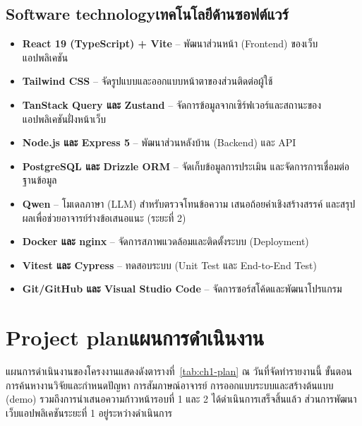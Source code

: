 \subsection{\ifenglish Software technology\else เทคโนโลยีด้านซอฟต์แวร์\fi}

\begin{itemize}
  \item \textbf{React 19 (TypeScript) + Vite} -- พัฒนาส่วนหน้า (Frontend) ของเว็บแอปพลิเคชัน
  \item \textbf{Tailwind CSS} -- จัดรูปแบบและออกแบบหน้าตาของส่วนติดต่อผู้ใช้
  \item \textbf{TanStack Query และ Zustand} -- จัดการข้อมูลจากเซิร์ฟเวอร์และสถานะของแอปพลิเคชันฝั่งหน้าเว็บ
  \item \textbf{Node.js และ Express 5} -- พัฒนาส่วนหลังบ้าน (Backend) และ API
  \item \textbf{PostgreSQL และ Drizzle ORM} -- จัดเก็บข้อมูลการประเมิน และจัดการการเชื่อมต่อฐานข้อมูล
  \item \textbf{Qwen} -- โมเดลภาษา (LLM) สำหรับตรวจโทนข้อความ เสนอถ้อยคำเชิงสร้างสรรค์ และสรุปผลเพื่อช่วยอาจารย์ร่างข้อเสนอแนะ (ระยะที่ 2)
  \item \textbf{Docker และ nginx} -- จัดการสภาพแวดล้อมและติดตั้งระบบ (Deployment)
  \item \textbf{Vitest และ Cypress} -- ทดสอบระบบ (Unit Test และ End-to-End Test)
  \item \textbf{Git/GitHub และ Visual Studio Code} -- จัดการซอร์สโค้ดและพัฒนาโปรแกรม
\end{itemize}

\section{\ifenglish Project plan\else แผนการดำเนินงาน\fi}

แผนการดำเนินงานของโครงงานแสดงดังตารางที่~\ref{tab:ch1-plan} ณ วันที่จัดทำรายงานนี้ ขั้นตอนการค้นหางานวิจัยและกำหนดปัญหา การสัมภาษณ์อาจารย์ การออกแบบระบบและสร้างต้นแบบ (demo) รวมถึงการนำเสนอความก้าวหน้ารอบที่ 1 และ 2 ได้ดำเนินการเสร็จสิ้นแล้ว ส่วนการพัฒนาเว็บแอปพลิเคชันระยะที่ 1 อยู่ระหว่างดำเนินการ

